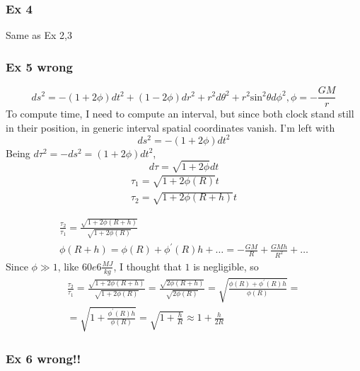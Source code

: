 \subsubsection{Ex 4}
Same as Ex 2,3
\subsubsection{Ex 5 wrong}
\[
ds^{2} = -\left( 1+2\phi  \right)dt^{2} +\left( 1-2\phi  \right)dr^{2}+r^{2}d\theta ^{2}+r^{2}\text{sin}^{2}\theta d\phi ^{2}, \phi = - \frac{GM}{r}	
\]
To compute time, I need to compute an interval, but since both clock stand still in their position, in generic interval spatial coordinates vanish. I'm left with
\[
ds^{2} = -\left( 1+2\phi  \right)dt^{2}
\]
Being $d\tau ^{2} =- ds^{2} = \left( 1+2\phi  \right)dt^{2}$,
\[
	d\tau  = \sqrt{1+2\phi }dt
\]
\begin{gather*}
	\tau _{1} = \sqrt{1+2\phi \left( R \right)}t \\
	\tau _{2} = \sqrt{1+2\phi \left( R+h \right)}t
\end{gather*}

\begin{gather*}
	\frac{\tau _{2}}{\tau _{1}} = \frac{\sqrt{1+2\phi\left( R+h \right)}}{\sqrt{1+2\phi \left( R \right)}} \\
\phi \left( R+h \right) = \phi \left( R \right) +\phi ^{\prime }\left( R \right)h +\ldots = - \frac{GM}{R} + \frac{GMh}{R^{2}} +\ldots 	 
\end{gather*}
Since $\phi\gg 1 $, like $60e6 \frac{MJ}{kg}$, I thought that $1$ is negligible, so
\begin{gather*}
\frac{\tau _{2}}{\tau _{1}} = \frac{\sqrt{1+2\phi \left( R+h \right)}}{\sqrt{1+2\phi \left( R \right)}} = \frac{\sqrt{2\phi \left( R+h \right)}}{\sqrt{2\phi \left( R \right)}} = \sqrt{ \frac{\phi \left( R \right) + \phi ^{\prime }\left( R \right)h}{\phi \left( R \right)}} =\\
= \sqrt{ 1+\frac{\phi ^{\prime }\left( R \right)h}{\phi \left( R \right)}} = \sqrt{1 + \frac{h}{R}} \approx 1+ \frac{h}{2R}	 
\end{gather*}
\subsubsection{Ex 6 wrong!!}


